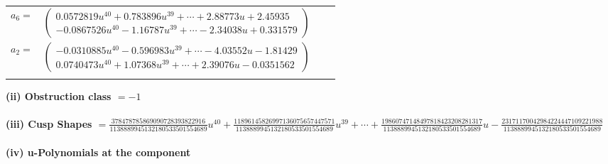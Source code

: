 \documentclass[1p]{elsarticle_modified}
\theoremstyle{definition}
\begin{document}
\begin{tabular}{m{7pt} m{180pt} m{7pt} m{180pt} }
\flushright $a_{6}=$&$\begin{pmatrix}0.0572819 u^{40}+0.783896 u^{39}+\cdots+2.88773 u+2.45935\\-0.0867526 u^{40}-1.16787 u^{39}+\cdots-2.34038 u+0.331579\end{pmatrix}$ \\
\flushright $a_{2}=$&$\begin{pmatrix}-0.0310885 u^{40}-0.596983 u^{39}+\cdots-4.03552 u-1.81429\\0.0740473 u^{40}+1.07368 u^{39}+\cdots+2.39076 u-0.0351562\end{pmatrix}$\\&\end{tabular}
\flushleft \textbf{(ii) Obstruction class $= -1$}\\~\\
\flushleft \textbf{(iii) Cusp Shapes $= \frac{378478785869090728393822916}{1138889945132180533501554689} u^{40}+\frac{11896145826997136075657447571}{1138889945132180533501554689} u^{39}+\cdots+\frac{19860747148497818423208281317}{1138889945132180533501554689} u-\frac{23171170042984224447109221988}{1138889945132180533501554689}$}\\~\\
\newpage\renewcommand{\arraystretch}{1}
\flushleft \textbf{(iv) u-Polynomials at the component}\newline \\
\end{document}
